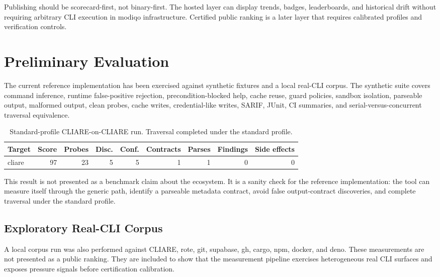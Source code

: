 \documentclass[11pt]{article}
\begin{document}
Publishing should be scorecard-first, not binary-first. The hosted layer can display trends, badges, leaderboards, and historical drift without requiring arbitrary CLI execution in modiqo infrastructure. Certified public ranking is a later layer that requires calibrated profiles and verification controls.

\section{Preliminary Evaluation}

The current reference implementation has been exercised against synthetic fixtures and a local real-CLI corpus. The synthetic suite covers command inference, runtime false-positive rejection, precondition-blocked help, cache reuse, guard policies, sandbox isolation, parseable output, malformed output, clean probes, cache writes, credential-like writes, SARIF, JUnit, CI summaries, and serial-versus-concurrent traversal equivalence.

\begin{table}[h]
\centering
\begin{tabular}{@{}lrrrrrrrr@{}}
\toprule
Target & Score & Probes & Disc. & Conf. & Contracts & Parses & Findings & Side effects \\
\midrule
cliare & 97 & 23 & 5 & 5 & 1 & 1 & 0 & 0 \\
\bottomrule
\end{tabular}
\caption{Standard-profile CLIARE-on-CLIARE run. Traversal completed under the standard profile.}
\end{table}

This result is not presented as a benchmark claim about the ecosystem. It is a sanity check for the reference implementation: the tool can measure itself through the generic path, identify a parseable metadata contract, avoid false output-contract discoveries, and complete traversal under the standard profile.

\subsection{Exploratory Real-CLI Corpus}

A local corpus run was also performed against CLIARE, rote, git, supabase, gh, cargo, npm, docker, and deno. These measurements are not presented as a public ranking. They are included to show that the measurement pipeline exercises heterogeneous real CLI surfaces and exposes pressure signals before certification calibration.
\end{document}
